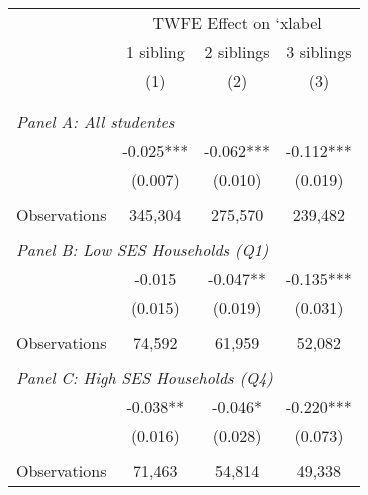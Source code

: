 \makeatletter
{}
{
\makeatother
\begin{tabular}{lccc}
\toprule
\cmidrule(lr){2-4}
& \multicolumn{3}{c}{TWFE Effect on `xlabel} \\
\cmidrule(lr){2-4}
& 1 sibling & 2 siblings & 3 siblings  \\
\cmidrule(lr){2-2} \cmidrule(lr){3-3} \cmidrule(lr){4-4}
& (1) & (2) & (3)\\
\bottomrule
&  &  &  \\
&  &  &   \\
\multicolumn{4}{l}{\textit{Panel A: All studentes}} \\
\hspace{3mm}        &      -0.025***&      -0.062***&      -0.112***\\
                    &     (0.007)   &     (0.010)   &     (0.019)   \\
                    &               &               &               \\
\hspace{3mm}Observations&     345,304   &     275,570   &     239,482   \\
 
&  &  &   \\
\multicolumn{4}{l}{\textit{Panel B: Low SES Households (Q1)}} \\
\hspace{3mm}        &      -0.015   &      -0.047** &      -0.135***\\
                    &     (0.015)   &     (0.019)   &     (0.031)   \\
                    &               &               &               \\
\hspace{3mm}Observations&      74,592   &      61,959   &      52,082   \\
 
&  &  &   \\
\multicolumn{4}{l}{\textit{Panel C: High SES Households (Q4)}} \\
\hspace{3mm}        &      -0.038** &      -0.046*  &      -0.220***\\
                    &     (0.016)   &     (0.028)   &     (0.073)   \\
                    &               &               &               \\
\hspace{3mm}Observations&      71,463   &      54,814   &      49,338   \\
 

\end{tabular}}
